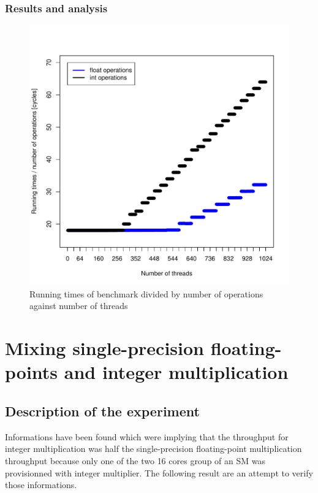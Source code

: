\documentclass{article}
\def \scalingfactor{.8}
\begin{document}
	\subsubsection{Results and analysis}

	\begin{figure}[h]
		\centering
		\vspace{-20pt}
    			\includegraphics[width=\scalingfactor\linewidth]{"graphics/latency_estimate"}
		\vspace{-15pt}
		\caption{Running times of benchmark divided by number of operations against number of threads}
	\end{figure}
	\pagebreak

\section{Mixing single-precision floating-points and integer multiplication}
	\subsection{Description of the experiment}
	Informations have been found which were implying that the throughput for integer multiplication was half the single-precision floating-point multiplication throughput because only one of the two 16 cores group of an SM was provisionned with integer multiplier.
	The following result are an attempt to verify those informations.
\end{document}
